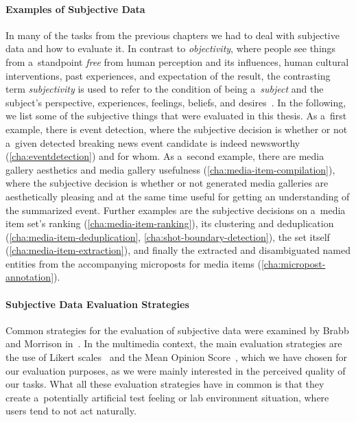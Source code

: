\paragraph{Examples of Subjective Data}

In many of the tasks from the previous chapters
we had to deal with subjective data and how to evaluate it.
In contrast to \emph{objectivity}, where people see things
from a~standpoint \emph{free} from human perception and its influences,
human cultural interventions, past experiences,
and expectation of the result,
the contrasting term \emph{subjectivity} is used to refer to the condition
of being a~\emph{subject} and the subject's perspective, experiences,
feelings, beliefs, and desires~\cite{honderich2005oxford}.
In the following, we list some of the subjective things
that were evaluated in this thesis.
As a~first example, there is event detection,
where the subjective decision is whether or not a~given detected breaking news event candidate is indeed newsworthy (\autoref{cha:eventdetection}) and for whom.
As a~second example, there are media gallery aesthetics and media gallery usefulness
(\autoref{cha:media-item-compilation}),
where the subjective decision is whether
or not generated media galleries are aesthetically pleasing 
and at the same time useful for getting an understanding
of the summarized event.
Further examples are the subjective decisions on a~media item set's
ranking (\autoref{cha:media-item-ranking}),
its clustering and deduplication (\autoref{cha:media-item-deduplication}, \autoref{cha:shot-boundary-detection}),
the set itself (\autoref{cha:media-item-extraction}),
and finally the extracted and disambiguated named entities
from the accompanying microposts for media items
(\autoref{cha:micropost-annotation}).

\paragraph{Subjective Data Evaluation Strategies}

Common strategies for the evaluation of subjective data were 
examined by Brabb and Morrison in~\cite{brabb1964evaluation}.
In the multimedia context, the main evaluation strategies are
the use of Likert scales~\cite{likert1932likertscale} 
and the Mean Opinion Score~\cite{itu1998mos},
which we have chosen for our evaluation purposes,
as we were mainly interested in the perceived quality of our tasks.
What all these evaluation strategies have in common is
that they create a~potentially artificial test feeling
or lab environment situation, where users tend to not act naturally.

